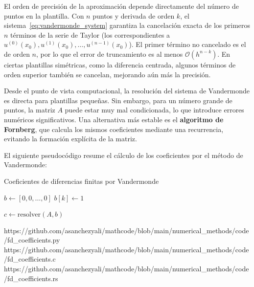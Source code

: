 El orden de precisión de la aproximación depende directamente del número de puntos en la plantilla. Con $n$ puntos y
derivada de orden $k$, el sistema~\eqref{eq:vandermonde_system} garantiza la cancelación exacta de los primeros $n$
términos de la serie de Taylor (los correspondientes a $u^{(0)}(x_0), u^{(1)}(x_0), \ldots, u^{(n-1)}(x_0)$). El
primer término no cancelado es el de orden $n$, por lo que el error de truncamiento es al menos
$\mathcal{O}(h^{n-k})$. En ciertas plantillas simétricas, como la diferencia centrada, algunos términos de orden
superior también se cancelan, mejorando aún más la precisión.

Desde el punto de vista computacional, la resolución del sistema de Vandermonde es directa para plantillas pequeñas.
Sin embargo, para un número grande de puntos, la matriz $A$ puede estar muy mal condicionada, lo que introduce errores
numéricos significativos. Una alternativa más estable es el \textbf{algoritmo de Fornberg}, que calcula los mismos
coeficientes mediante una recurrencia, evitando la formación explícita de la matriz.

El siguiente pseudocódigo resume el cálculo de los coeficientes por el método de Vandermonde:

\begin{algorithmbox}{Coeficientes de diferencias finitas por Vandermonde}
    \label{alg:fd_coefficients}
    \begin{minipage}[t]{\dimexpr\linewidth-2cm\relax}
    \begin{algorithm}[H]
        \DontPrintSemicolon
        \SetAlgoVlined
        \BlankLine

        \BlankLine

        \BlankLine

        $b \leftarrow [0, 0, \ldots, 0]$\;
        $b[k] \leftarrow 1$\;
        \BlankLine

        $c \leftarrow \text{resolver}(A, b)$\;
        \BlankLine

        \;
    \end{algorithm}
    \end{minipage}%
    \hfill
    \codeqrsidebar
        {https://github.com/asanchezyali/mathcode/blob/main/numerical_methods/code/fd_coefficients.py}
        {https://github.com/asanchezyali/mathcode/blob/main/numerical_methods/code/fd_coefficients.c}
        {https://github.com/asanchezyali/mathcode/blob/main/numerical_methods/code/fd_coefficients.rs}
\end{algorithmbox}
